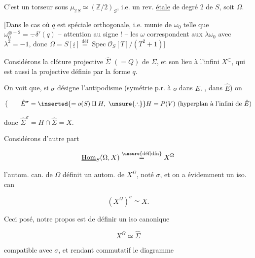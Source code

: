 C'est un torseur sous $\mu_{2\,S}\simeq(\mathbb Z/2)_S$, i.e. un rev. \uline{étale} de degré 2 de $S$, soit $\Omega$.



[Dans le cas où $q$ est spéciale orthogonale, i.e. munie de $\omega_0$ telle que $\omega_0^{\otimes-2}=\underline{-}\delta'(q)$ -- attention au signe ! -- les $\omega$ correspondent aux $\lambda\omega_0$ avec $\lambda^2=-1$, donc $\Omega=S[\underline i]\overset{\text{déf}}{=}\operatorname{Spec}\mathcal O_S[T]/(T^2+1)$]

Considérons la clôture projective $\hat\Sigma$ $(=Q)$ de $\Sigma$, et \deleted{\unsure{$\Sigma$}} son lieu à l'infini $X^{\subset}$, qui est aussi la  projective  définie par la forme $q$.

On voit que, \deleted{\unsure{$\Sigma$}} si $\sigma$ désigne l'antipodisme (symétrie p.r. à $o$ dans $E$, , dans $\hat E$) on

\[
\bigl(\qquad\hat E^\sigma=\inserted{=o(S)\amalg H,\ \unsure{\therefore}} H=P(V)\text{ (hyperplan à l'infini de }\hat E)
\]

donc $\hat\Sigma^\sigma=H\cap\hat\Sigma=X$.



Considérons  d'autre part

\[
\underline{\operatorname{Hom}}_S(\Omega,X)\overset{\unsure{\text{déf}|\text{dfn}}}{=}X^\Omega
\]

l'autom. can. de $\Omega$ définit un autom. de $X^\Omega$, noté  $\sigma$,  et on a évidemment un iso. can

\[
(X^\Omega)^\sigma\simeq X.
\]

Ceci posé, notre propos est de définir un iso canonique

\[
X^\Omega\simeq\hat\Sigma
\]

compatible avec $\sigma$, et rendant commutatif le diagramme


